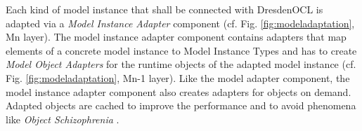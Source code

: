 	Each kind of model instance that shall be connected with DresdenOCL is
	adapted via a \emph{Model Instance Adapter} component (cf. Fig.
	\ref{fig:modeladaptation}, Mn layer). The model instance adapter component contains adapters that map elements of a
	concrete model instance to Model Instance Types and has to
	create \emph{Model Object Adapters} for the runtime 
	objects of the adapted model instance (cf. Fig. \ref{fig:modeladaptation}, Mn-1 layer). 
	Like the model adapter component, the model instance adapter component also 
	creates adapters for objects on demand. Adapted objects are cached to
	improve the performance and to avoid phenomena like \emph{Object
	Schizophrenia} \cite{assmann:isc}.
	


